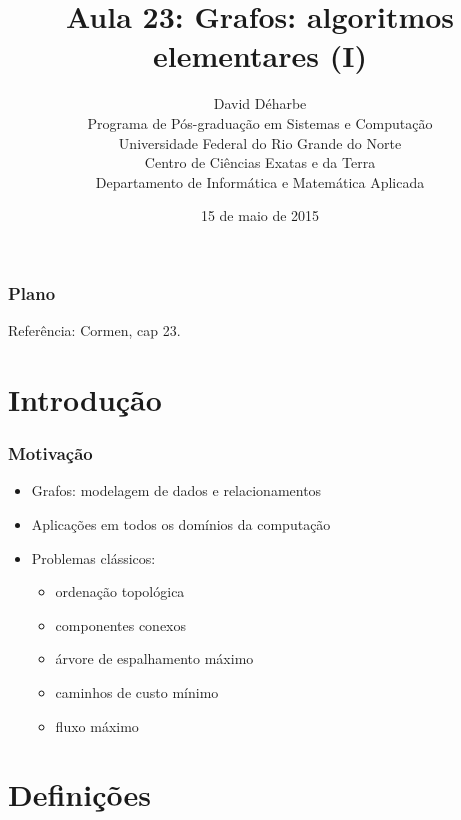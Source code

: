 \documentclass{beamer}
\title{Aula 23: Grafos: algoritmos elementares (I)}
\author{David Déharbe \\
  Programa de Pós-graduação em Sistemas e Computação \\
  Universidade Federal do Rio Grande do Norte \\
  Centro de Ciências Exatas e da Terra \\
  Departamento de Informática e Matemática Aplicada}
\date{15 de maio de 2015}
\begin{document}

\begin{frame}
  \titlepage
\end{frame}

\begin{frame}
  \frametitle{Plano}
  \tableofcontents

Referência: Cormen, cap 23.
\end{frame}

\section{Introdução}

\begin{frame}
\frametitle{Motivação}

\begin{itemize}
\item Grafos: modelagem de dados e relacionamentos 
\item Aplicações em todos os domínios da computação
\item Problemas clássicos: 
\begin{itemize}
\item ordenação topológica
\item componentes conexos
\item árvore de espalhamento máximo
\item caminhos de custo mínimo 
\item fluxo máximo
\end{itemize}
\end{itemize}
\end{frame}

\section{Definições}
\end{document}
